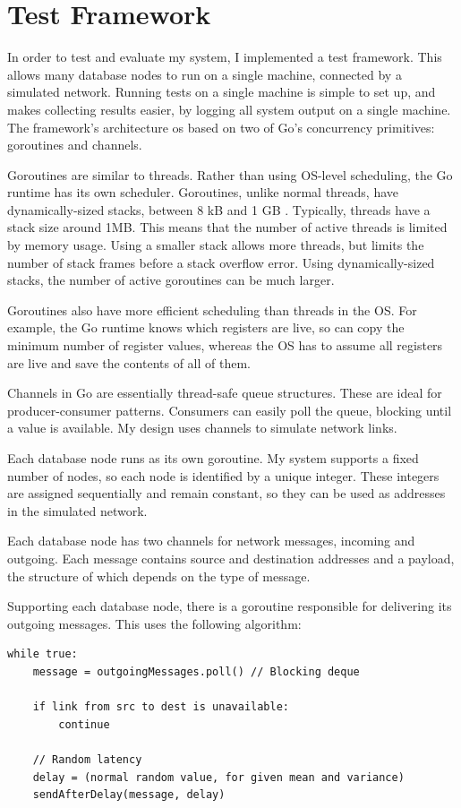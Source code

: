 \documentclass[12pt,a4paper,twoside,openany]{report}
\begin{document}
\section{Test Framework}

In order to test and evaluate my system, I implemented a test framework. This allows many database nodes to run on a single machine, connected by a simulated network. Running tests on a single machine is simple to set up, and makes collecting results easier, by logging all system output on a single machine. The framework's architecture os based on two of Go's concurrency primitives: goroutines and channels.

Goroutines are similar to threads. Rather than using OS-level scheduling, the Go runtime has its own scheduler. Goroutines, unlike normal threads, have dynamically-sized stacks, between 8 kB and 1 GB \cite{gosrc}. Typically, threads have a stack size around 1MB. This means that the number of active threads is limited by memory usage. Using a smaller stack allows more threads, but limits the number of stack frames before a stack overflow error. Using dynamically-sized stacks, the number of active goroutines can be much larger.

Goroutines also have more efficient scheduling than threads in the OS. For example, the Go runtime knows which registers are live, so can copy the minimum number of register values, whereas the OS has to assume all registers are live and save the contents of all of them.

Channels in Go are essentially thread-safe queue structures. These are ideal for producer-consumer patterns. Consumers can easily poll the queue, blocking until a value is available. My design uses channels to simulate network links.

Each database node runs as its own goroutine. My system supports a fixed number of nodes, so each node is identified by a unique integer. These integers are assigned sequentially and remain constant, so they can be used as addresses in the simulated network.

Each database node has two channels for network messages, incoming and outgoing. Each message contains source and destination addresses and a payload, the structure of which depends on the type of message.

Supporting each database node, there is a goroutine responsible for delivering its outgoing messages. This uses the following algorithm:

\begin{lstlisting}
while true:
    message = outgoingMessages.poll() // Blocking deque

    if link from src to dest is unavailable:
        continue

    // Random latency
    delay = (normal random value, for given mean and variance)
    sendAfterDelay(message, delay)
\end{lstlisting}
\end{document}
